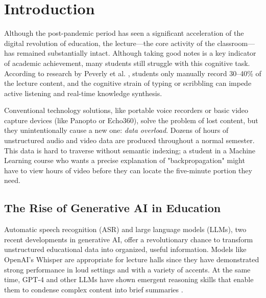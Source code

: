 \documentclass[runningheads]{llncs}
\begin{document}
\section{Introduction}
Although the post-pandemic period has seen a significant acceleration of the digital revolution of education, the lecture—the core activity of the classroom—has remained substantially intact. Although taking good notes is a key indicator of academic achievement, many students still struggle with this cognitive task. According to research by Peverly et al. \cite{peverly,mueller2014}, students only manually record 30–40\% of the lecture content, and the cognitive strain of typing or scribbling can impede active listening and real-time knowledge synthesis.

Conventional technology solutions, like portable voice recorders or basic video capture devices (like Panopto or Echo360), solve the problem of lost content, but they unintentionally cause a new one: \emph{data overload}. Dozens of hours of unstructured audio and video data are produced throughout a normal semester. This data is hard to traverse without semantic indexing; a student in a Machine Learning course who wants a precise explanation of "backpropagation" might have to view hours of video before they can locate the five-minute portion they need.

\subsection{The Rise of Generative AI in Education}
Automatic speech recognition (ASR) and large language models (LLMs), two recent developments in generative AI, offer a revolutionary chance to transform unstructured educational data into organized, useful information. Models like OpenAI's Whisper \cite{openai2022,whisper} are appropriate for lecture halls since they have demonstrated strong performance in loud settings and with a variety of accents. At the same time, GPT-4 and other LLMs have shown emergent reasoning skills that enable them to condense complex content into brief summaries \cite{gpt4}.
\end{document}
